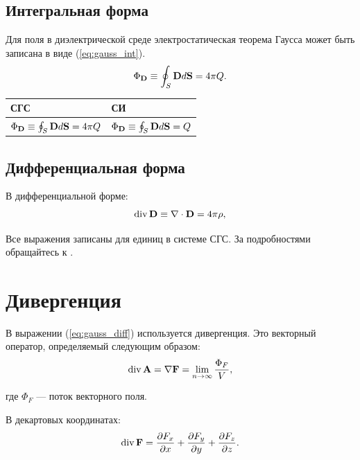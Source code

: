 \documentclass{amcs}
\begin{document}
\subsection{Интегральная форма}
Для поля в диэлектрической среде электростатическая теорема Гаусса может быть записана в виде (\ref{eq:gauss_int}).
\begin{equation} \label{eq:gauss_int}
\Phi_{\boldsymbol{\mathbf{D}}}\equiv\oint_S\boldsymbol{\mathbf{D}}d\boldsymbol{\mathbf{S}}=4\pi Q.
\end{equation}
\begin{center} 
\begin{tabular}[t]{|p{16em}|p{16em}|} 
\hline 
СГС & СИ \\ 
\hline 
\(\Phi_{\boldsymbol{\mathbf{D}}}\equiv\oint_S\boldsymbol{\mathbf{D}}d\boldsymbol{\mathbf{S}}=4\pi Q\) & \(\Phi_{\boldsymbol{\mathbf{D}}}\equiv\oint_S\boldsymbol{\mathbf{D}}d\boldsymbol{\mathbf{S}}=Q\) \\ 
\hline 
\end{tabular}
\end{center}

\subsection{Дифференциальная форма}
В дифференциальной форме:
\begin{equation} \label{eq:gauss_diff}
\operatorname{div}\boldsymbol{\mathbf{D}}\equiv\nabla\cdot\boldsymbol{\mathbf{D}}=4\pi\rho,
\end{equation}

Все выражения записаны для единиц в системе СГС. За подробностями обращайтесь к \cite{b0}.

\section{Дивергенция}
В выражении (\ref{eq:gauss_diff}) используется дивергенция. Это векторный оператор, определяемый следующим образом:
\begin{equation} \label{eq:div_vec}
\operatorname{div}\boldsymbol{\mathbf{A}}=\nabla\boldsymbol{\mathbf{F}}=\lim_{n \to \infty}\frac{\Phi_F}{V},
\end{equation}

где $\Phi_F$ --- поток векторного поля.

В декартовых координатах:
\begin{equation} \label{eq:div_dec}
\operatorname{div}\boldsymbol{\mathbf{F}}=\frac{\partial F_x}{\partial x}+\frac{\partial F_y}{\partial y}+\frac{\partial F_z}{\partial z}.
\end{equation}

\end{document}
